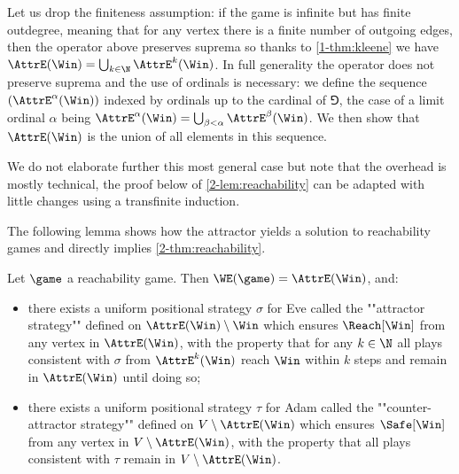 Let us drop the finiteness assumption: if the game is infinite but has finite outdegree, meaning that for any vertex there is a finite number of outgoing edges, then the operator above preserves suprema so thanks to \cref{1-thm:kleene} 
we have $\AttrE(\Win) = \bigcup_{k \in \N} \AttrE^k(\Win)$.
In full generality the operator does not preserve suprema and the use of ordinals is necessary:
we define the sequence $(\AttrE^{\alpha}(\Win))$ indexed by ordinals up to the cardinal of $\Game$,
the case of a limit ordinal $\alpha$ being $\AttrE^{\alpha}(\Win) = \bigcup_{\beta < \alpha} \AttrE^{\beta}(\Win)$.
We then show that $\AttrE(\Win)$ is the union of all elements in this sequence.

We do not elaborate further this most general case but note that the overhead is mostly technical, the proof below of \cref{2-lem:reachability} can be adapted with little changes using a transfinite induction.

The following lemma shows how the attractor yields a solution to reachability games and directly implies \cref{2-thm:reachability}.

\begin{lemma}
\label{2-lem:reachability}
Let $\game$ a reachability game.
Then $\WE(\game) = \AttrE(\Win)$, and:
\begin{itemize}
	\item there exists a uniform positional strategy $\sigma$ for Eve called the ""attractor strategy"" defined on $\AttrE(\Win) \setminus \Win$
	which ensures $\Reach[\Win]$ from any vertex in $\AttrE(\Win)$, 
	with the property that for any $k \in \N$ all plays consistent with $\sigma$ from $\AttrE^{k}(\Win)$ reach $\Win$ within $k$ steps 
	and remain in $\AttrE(\Win)$ until doing so;
	\item there exists a uniform positional strategy $\tau$ for Adam called the ""counter-attractor strategy"" defined on $V \setminus \AttrE(\Win)$
	which ensures $\Safe[\Win]$ from any vertex in $V \setminus \AttrE(\Win)$,
	with the property that all plays consistent with $\tau$ remain in $V \setminus \AttrE(\Win)$.
\end{itemize}
\end{lemma}



